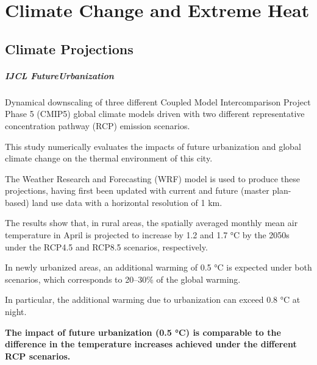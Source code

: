 \documentclass[12pt]{caltech_thesis}
\begin{document}
\chapter{Climate Change and Extreme Heat}

\section{Climate Projections}
\begin{bibunit}
\paragraph{\citep{Doan2018} IJCL FutureUrbanization}
Dynamical downscaling of three different Coupled Model Intercomparison Project Phase 5 (CMIP5) global climate models driven with two different representative concentration pathway (RCP) emission scenarios.

This study numerically evaluates the impacts of future urbanization and global climate change on the thermal environment of this city.

The Weather Research and Forecasting (WRF) model is used to produce these projections, having first been updated with current and future (master plan-based) land use data with a horizontal resolution of 1 km.

The results show that, in rural areas, the spatially averaged monthly mean air temperature in April is projected to increase by 1.2 and 1.7 °C by the 2050s under the RCP4.5 and RCP8.5 scenarios, respectively. 

In newly urbanized areas, an additional warming of 0.5 °C is expected under both scenarios, which corresponds to 20–30\% of the global warming. 

In particular, the additional warming due to urbanization can exceed 0.8 °C at night. 

\textbf{The impact of future urbanization (0.5 °C) is comparable to the difference in the temperature increases achieved under the different RCP scenarios.}


\renewcommand{\bibsection}{\section*{\refname}}
\putbib[ownpubs]  %
\end{bibunit}
\end{document}
